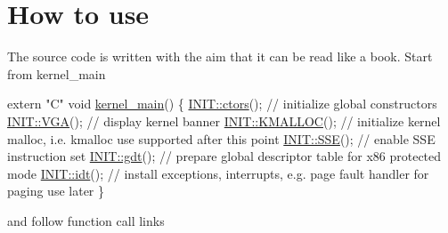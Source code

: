 \hypertarget{index_intro_sec}{}\section{How to use}\label{index_intro_sec}
The source code is written with the aim that it can be read like a book. Start from kernel\+\_\+main 
\begin{DoxyCodeInclude}
\textcolor{keyword}{extern} \textcolor{stringliteral}{"C"} \textcolor{keywordtype}{void} \hyperlink{kernel_8cpp_ada8402e0c504af8cafef5cc76c076003}{kernel\_main}()
\{
    \hyperlink{namespace_i_n_i_t_a6608557e41ad37cdb4a408e2f05c9783}{INIT::ctors}();   \textcolor{comment}{// initialize global constructors}
    \hyperlink{namespace_i_n_i_t_abae5789d80f8edd37455f3b167779654}{INIT::VGA}();     \textcolor{comment}{// display kernel banner}
    \hyperlink{namespace_i_n_i_t_ac811302ce0948a6a097b445b811f9c14}{INIT::KMALLOC}(); \textcolor{comment}{// initialize kernel malloc, i.e. kmalloc use supported after this point}
    \hyperlink{namespace_i_n_i_t_a8928ddbb4ca671dfe1c740da380fa0c4}{INIT::SSE}();     \textcolor{comment}{// enable SSE instruction set}
    \hyperlink{namespace_i_n_i_t_a3462d7bc51bce77cc240d05b62b1b777}{INIT::gdt}();     \textcolor{comment}{// prepare global descriptor table for x86 protected mode}
    \hyperlink{namespace_i_n_i_t_aec8e9f01cb09653075b6e610096b3ca9}{INIT::idt}();     \textcolor{comment}{// install exceptions, interrupts, e.g. page fault handler for paging use
       later}
\}
\end{DoxyCodeInclude}
and follow function call links 